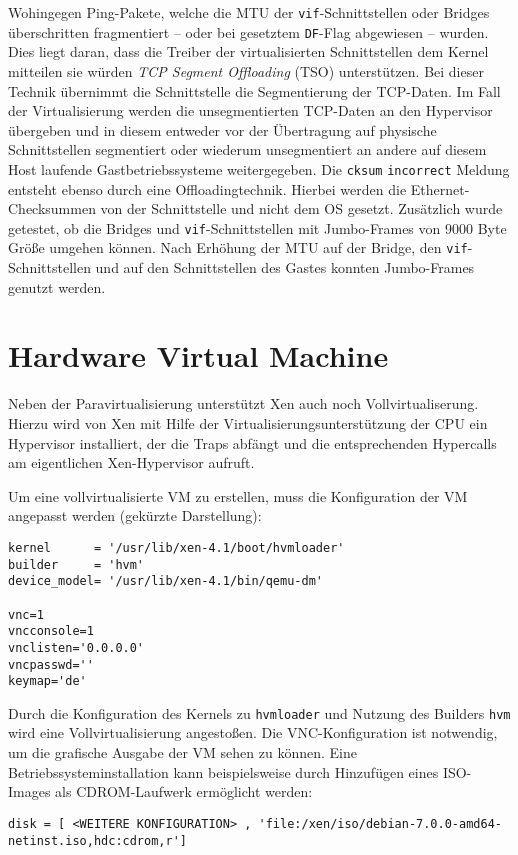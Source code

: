 Wohingegen Ping-Pakete, welche die MTU der \verb#vif#-Schnittstellen oder Bridges überschritten fragmentiert -- oder bei gesetztem \verb#DF#-Flag abgewiesen -- wurden.
Dies liegt daran, dass die Treiber der virtualisierten Schnittstellen dem Kernel mitteilen sie würden \emph{TCP Segment Offloading} (TSO) unterstützen. Bei dieser Technik übernimmt die Schnittstelle die Segmentierung der TCP-Daten. Im Fall der Virtualisierung werden die unsegmentierten TCP-Daten an den Hypervisor übergeben und in diesem entweder vor der Übertragung auf physische Schnittstellen segmentiert oder wiederum unsegmentiert an andere auf diesem Host laufende Gastbetriebssysteme weitergegeben. Die \verb#cksum# \verb#incorrect# Meldung entsteht ebenso durch eine Offloadingtechnik. Hierbei werden die Ethernet-Checksummen von der Schnittstelle und nicht dem OS gesetzt. 
Zusätzlich wurde getestet, ob die Bridges und \verb#vif#-Schnittstellen mit Jumbo-Frames von 9000 Byte Größe umgehen können. Nach Erhöhung der MTU auf der Bridge, den \verb#vif#-Schnittstellen und auf den Schnittstellen des Gastes konnten Jumbo-Frames genutzt werden.

\section{Hardware Virtual Machine}
\label{hvm_vm}
Neben der Paravirtualisierung unterstützt Xen auch noch Vollvirtualiserung. Hierzu wird von Xen mit Hilfe der Virtualisierungsunterstützung der CPU ein Hypervisor installiert, der die Traps abfängt und die entsprechenden Hypercalls am eigentlichen Xen-Hypervisor aufruft.

Um eine vollvirtualisierte VM zu erstellen, muss die Konfiguration der VM angepasst werden (gekürzte Darstellung):
\setupVerbatimOut
\begin{verbatim}
kernel      = '/usr/lib/xen-4.1/boot/hvmloader'
builder     = 'hvm'
device_model= '/usr/lib/xen-4.1/bin/qemu-dm'

vnc=1
vncconsole=1
vnclisten='0.0.0.0'
vncpasswd=''
keymap='de'
\end{verbatim}

Durch die Konfiguration des Kernels zu \verb#hvmloader# und Nutzung des Builders \verb#hvm# wird eine Vollvirtualisierung angestoßen. Die VNC-Konfiguration ist notwendig, um die grafische Ausgabe der VM sehen zu können. Eine Betriebssysteminstallation kann beispielsweise durch Hinzufügen eines ISO-Images als CDROM-Laufwerk ermöglicht werden: 
\setupVerbatimOut
\begin{verbatim}
disk = [ <WEITERE KONFIGURATION> , 'file:/xen/iso/debian-7.0.0-amd64-netinst.iso,hdc:cdrom,r']
\end{verbatim}

